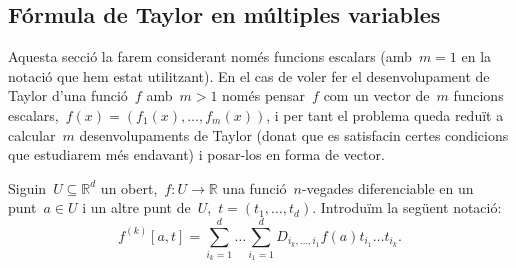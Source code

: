 \documentclass[../../main.tex]{subfiles}
\begin{document}
    \subsection{Fórmula de Taylor en múltiples variables}
    Aquesta secció la farem considerant només funcions escalars (amb~\(m=1\) en la notació que hem estat utilitzant).
    En el cas de voler fer el desenvolupament de Taylor d'una funció~\(f\) amb~\(m>1\) només pensar~\(f\) com un vector de~\(m\) funcions escalars,~\(f(x)=(f_{1}(x),\dots,f_{m}(x))\), i per tant el problema queda reduït a calcular~\(m\) desenvolupaments de Taylor (donat que es satisfacin certes condicions que estudiarem més endavant) i posar-los en forma de vector.
    \begin{notation}
        Siguin~\(U\subseteq\mathbb{R}^{d}\) un obert,~\(f\colon U\to\mathbb{R}\) una funció~\(n\)-vegades diferenciable en un punt~\(a\in U\) i un altre punt de~\(U\),~\(t=(t_{1},\dots,t_{d})\).
        Introduïm la següent notació:
        \[
            f^{(k)}[a,t]=\sum_{i_{k}=1}^{d}\dots\sum_{i_{1}=1}^{d}D_{i_{k},\dots,i_{1}}f(a)t_{i_{1}}\dots t_{i_{k}}.
        \]
    \end{notation}
\end{document}
